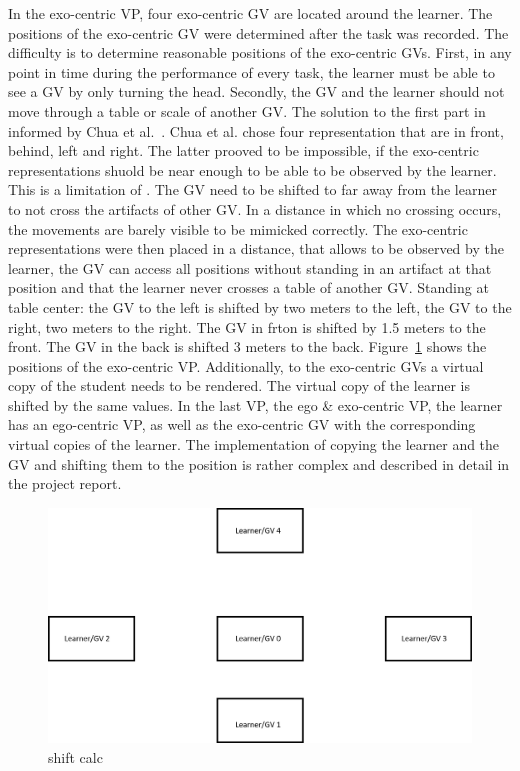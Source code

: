 In the exo-centric VP, four exo-centric GV are located around the learner. The positions of the exo-centric GV were determined after the task was recorded. The difficulty is to determine reasonable positions of the exo-centric GVs. First, in any point in time during the performance of every task, the learner must be able to see a GV by only turning the head. Secondly, the GV and the learner should not move through a table or scale of another GV. The solution to the first part in informed by Chua et al.~\cite{thaichichua}. Chua et al. chose four representation that are in front, behind, left and right. The latter prooved to be impossible, if the exo-centric representations shuold be near enough to be able to be observed by the learner. This is a limitation of \exgo. The GV need to be shifted to far away from the learner to not cross the artifacts of other GV. In a distance in which no crossing occurs, the movements are barely visible to be mimicked correctly. The exo-centric representations were then placed in a distance, that allows to be observed by the learner,  the GV can access all positions without standing in an artifact at that position and that the learner never crosses a table of another GV. Standing at table center: the GV to the left is shifted by two meters to the left, the GV to the right, two meters to the right. The GV in frton is shifted by 1.5 meters to the front. The GV in the back is shifted 3 meters to the back. Figure~\ref{fig:multireppositions} shows the positions of the exo-centric VP. Additionally, to the exo-centric GVs a virtual copy of the student needs to be rendered. The virtual copy of the learner is shifted by the same values. In the last VP, the ego \& exo-centric VP, the learner has an ego-centric VP, as well as the exo-centric GV with the corresponding virtual copies of the learner. The implementation of copying the learner and the GV and shifting them to the position is rather complex and described in detail in the project report.\\
\begin{figure}[htb]
	\centering
	\includegraphics[width=\textwidth]{figures/positions.png}
	\caption[Positions of exo-centric GVs]{shift calc}
	\label{fig:multireppositions}
\end{figure}

